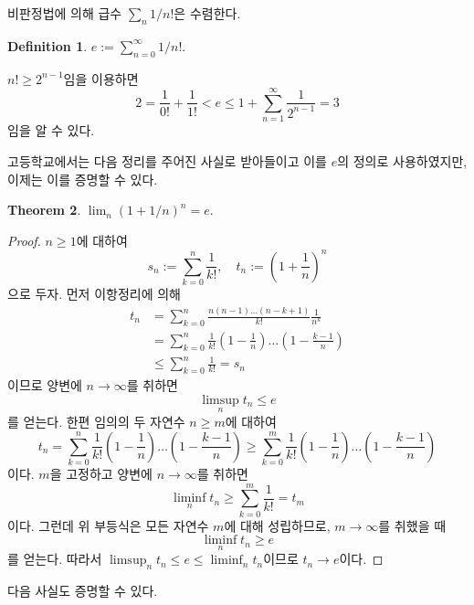 \documentclass[11pt]{book}
\numberwithin{equation}{chapter}
\newcommand{\paren}[1]{\left(#1\right)}
\theoremstyle{definition}
\newtheorem{thm}{Theorem}[section]
\newtheorem{defn}[thm]{Definition}
\begin{document}
비판정법에 의해 급수 \(\sum_n 1/n!\)은 수렴한다.

\begin{defn}
    \(e := \sum_{n=0}^\infty 1/n!\).
\end{defn}

\(n! \ge 2^{n-1}\)임을 이용하면
\[
2 = \frac{1}{0!} + \frac{1}{1!} < e \le 1 + \sum_{n=1}^\infty \frac{1}{2^{n-1}} = 3
\]
임을 알 수 있다.

고등학교에서는 다음 정리를 주어진 사실로 받아들이고 이를 \(e\)의 정의로 사용하였지만, 이제는 이를 증명할 수 있다.

\begin{thm}
    \(\lim_n (1 + 1/n)^n = e\).
\end{thm}
\begin{proof}
    \(n \ge 1\)에 대하여
    \[
    s_n := \sum_{k=0}^n \frac{1}{k!}, \quad t_n := \paren{1 + \frac{1}{n}}^n    
    \]
    으로 두자. 먼저 이항정리에 의해
    \begin{align*}
        t_n &= \sum_{k=0}^n \frac{n(n-1)\ldots(n-k+1)}{k!} \frac{1}{n^k}\\
        &= \sum_{k=0}^n \frac{1}{k!} \paren{1 - \frac{1}{n}} \ldots \paren{1 - \frac{k-1}{n}}\\
        &\le \sum_{k=0}^n \frac{1}{k!} = s_n
    \end{align*}
    이므로 양변에 \(n \to \infty\)를 취하면
    \[
    \limsup_n t_n \le e
    \]
    를 얻는다. 한편 임의의 두 자연수 \(n \ge m\)에 대하여
    \[
    t_n = \sum_{k=0}^n \frac{1}{k!} \paren{1 - \frac{1}{n}} \ldots \paren{1 - \frac{k-1}{n}} \ge \sum_{k=0}^m \frac{1}{k!} \paren{1 - \frac{1}{n}} \ldots \paren{1 - \frac{k-1}{n}}
    \]
    이다. \(m\)을 고정하고 양변에 \(n \to \infty\)를 취하면
    \[
    \liminf_n t_n \ge \sum_{k=0}^m \frac{1}{k!} = t_m
    \]
    이다. 그런데 위 부등식은 모든 자연수 \(m\)에 대해 성립하므로, \(m \to \infty\)를 취했을 때
    \[
    \liminf_n t_n \ge e    
    \]
    를 얻는다. 따라서 \(\limsup_n t_n \le e \le \liminf_n t_n\)이므로 \(t_n \to e\)이다.
\end{proof}

다음 사실도 증명할 수 있다.
\end{document}
